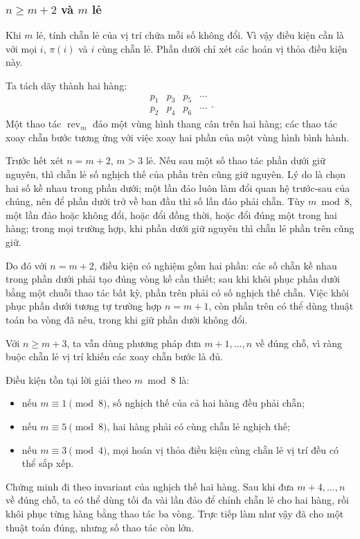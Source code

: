\documentclass[11pt]{article}
\begin{document}
\subsubsection{\texorpdfstring{\(n\ge m+2\) và \(m\) lẻ}{n>=m+2 và m lẻ}}

Khi $m$ lẻ, tính chẵn lẻ của vị trí chứa mỗi số không đổi. Vì vậy điều kiện cần
là với mọi $i$, $\pi(i)$ và $i$ cùng chẵn lẻ. Phần dưới chỉ xét các hoán vị thỏa
điều kiện này.

Ta tách dãy thành hai hàng:
\[
  \begin{matrix}
    p_1 & p_3 & p_5 & \cdots\\
    p_2 & p_4 & p_6 & \cdots
  \end{matrix}.
\]
Một thao tác $\operatorname{rev}_m$ đảo một vùng hình thang cân trên hai hàng;
các thao tác xoay chẵn bước tương ứng với việc xoay hai phần của một vùng hình
bình hành.

Trước hết xét $n=m+2$, $m>3$ lẻ. Nếu sau một số thao tác phần dưới giữ nguyên,
thì chẵn lẻ số nghịch thế của phần trên cũng giữ nguyên. Lý do là chọn hai số
kề nhau trong phần dưới; một lần đảo luôn làm đổi quan hệ trước-sau của chúng,
nên để phần dưới trở về ban đầu thì số lần đảo phải chẵn. Tùy $m\bmod 8$, một
lần đảo hoặc không đổi, hoặc đổi đồng thời, hoặc đổi đúng một trong hai hàng;
trong mọi trường hợp, khi phần dưới giữ nguyên thì chẵn lẻ phần trên cũng giữ.

Do đó với $n=m+2$, điều kiện có nghiệm gồm hai phần: các số chẵn kề nhau trong
phần dưới phải tạo đúng vòng kề cần thiết; sau khi khôi phục phần dưới bằng một
chuỗi thao tác bất kỳ, phần trên phải có số nghịch thế chẵn. Việc khôi phục
phần dưới tương tự trường hợp $n=m+1$, còn phần trên có thể dùng thuật toán ba
vòng đã nêu, trong khi giữ phần dưới không đổi.

Với $n\ge m+3$, ta vẫn dùng phương pháp đưa $m+1,\ldots,n$ về đúng chỗ, vì ràng
buộc chẵn lẻ vị trí khiến các xoay chẵn bước là đủ.

Điều kiện tồn tại lời giải theo $m\bmod 8$ là:
\begin{itemize}
  \item nếu $m\equiv 1\pmod 8$, số nghịch thế của cả hai hàng đều phải chẵn;
  \item nếu $m\equiv 5\pmod 8$, hai hàng phải có cùng chẵn lẻ nghịch thế;
  \item nếu $m\equiv 3\pmod 4$, mọi hoán vị thỏa điều kiện cùng chẵn lẻ vị trí
  đều có thể sắp xếp.
\end{itemize}
Chứng minh đi theo invariant của nghịch thế hai hàng. Sau khi đưa
$m+4,\ldots,n$ về đúng chỗ, ta có thể dùng tối đa vài lần đảo để chỉnh chẵn lẻ
cho hai hàng, rồi khôi phục từng hàng bằng thao tác ba vòng. Trực tiếp làm như
vậy đã cho một thuật toán đúng, nhưng số thao tác còn lớn.
\end{document}

